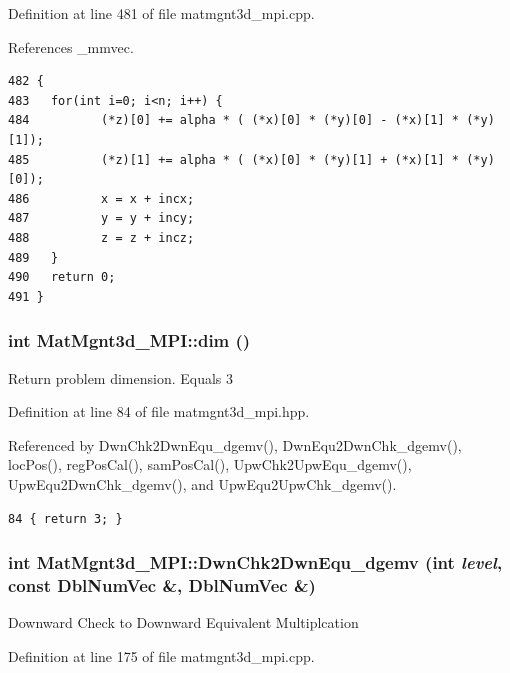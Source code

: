 Definition at line 481 of file matmgnt3d\_\-mpi.cpp.

References \_\-mmvec.

\footnotesize\begin{verbatim}482 {
483   for(int i=0; i<n; i++) {
484          (*z)[0] += alpha * ( (*x)[0] * (*y)[0] - (*x)[1] * (*y)[1]);
485          (*z)[1] += alpha * ( (*x)[0] * (*y)[1] + (*x)[1] * (*y)[0]);
486          x = x + incx;
487          y = y + incy;
488          z = z + incz;
489   }  
490   return 0;
491 }
\end{verbatim}\normalsize 


\subsubsection{\setlength{\rightskip}{0pt plus 5cm}int Mat\-Mgnt3d\_\-MPI::dim ()\hspace{0.3cm}{\tt  [inline]}}\label{classMatMgnt3d__MPI_e3f9953141ca7d7525b58c0ff1ef6b1f_e3f9953141ca7d7525b58c0ff1ef6b1f}


Return problem dimension. Equals 3 

Definition at line 84 of file matmgnt3d\_\-mpi.hpp.

Referenced by Dwn\-Chk2Dwn\-Equ\_\-dgemv(), Dwn\-Equ2Dwn\-Chk\_\-dgemv(), loc\-Pos(), reg\-Pos\-Cal(), sam\-Pos\-Cal(), Upw\-Chk2Upw\-Equ\_\-dgemv(), Upw\-Equ2Dwn\-Chk\_\-dgemv(), and Upw\-Equ2Upw\-Chk\_\-dgemv().

\footnotesize\begin{verbatim}84 { return 3; }
\end{verbatim}\normalsize 


\subsubsection{\setlength{\rightskip}{0pt plus 5cm}int Mat\-Mgnt3d\_\-MPI::Dwn\-Chk2Dwn\-Equ\_\-dgemv (int {\em level}, const Dbl\-Num\-Vec \&, Dbl\-Num\-Vec \&)}\label{classMatMgnt3d__MPI_b3f2a5306c0edee2c9df2722feb84c6c_b3f2a5306c0edee2c9df2722feb84c6c}


Downward Check to Downward Equivalent Multiplcation 

Definition at line 175 of file matmgnt3d\_\-mpi.cpp.

